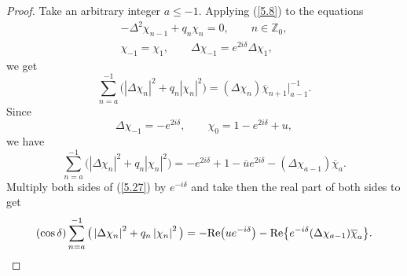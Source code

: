 \begin{proof}
Take an arbitrary integer $a\leq -1.$ Applying (\ref{5.8}) to the equations%
\begin{gather*}
-\Delta ^{2}\chi _{n-1}+q_{n}\chi _{n}=0,\qquad n\in
\mathbb{Z}
_{0},
\\
\chi _{-1}=\chi _{1},\qquad \Delta \chi _{-1}=e^{2i\delta }\Delta \chi
_{1},
\end{gather*}
we get%
\[
\sum_{n=a}^{-1}\big( \left\vert \Delta \chi _{n}\right\vert
^{2}+q_{n}\left\vert \chi _{n}\right\vert ^{2}\big) =(\Delta \chi _{n})%
\overline{\chi }_{n+1}\big|_{a-1}^{-1}.
\]%
Since%
\[
\Delta \chi _{-1}=-e^{2i\delta },\qquad \chi _{0}=1-e^{2i\delta }+u,
\]%
we have%
\begin{equation}
\sum_{n=a}^{-1}\big( \left\vert \Delta \chi _{n}\right\vert
^{2}+q_{n}\left\vert \chi _{n}\right\vert ^{2}\big) =-e^{2i\delta }+1-%
\overline{u}e^{2i\delta }-(\Delta \chi _{a-1})\overline{\chi }_{a}.
\label{5.27}
\end{equation}%
Multiply both sides of (\ref{5.27}) by $e^{-i\delta }$ and take then the
real part of both sides to get%
\begin{equation}
(\cos \delta )\sum_{n=a}^{-1}\big( \left\vert \Delta \chi _{n}\right\vert
^{2}+q_{n}\left\vert \chi _{n}\right\vert ^{2}\big) =-{\rm Re}
\big(ue^{-i\delta }\big)-{\rm Re}\big\{ e^{-i\delta }(\Delta \chi _{a-1})%
\overline{\chi }_{a}\big\} .  \label{5.28}
\end{equation}


\end{proof}
